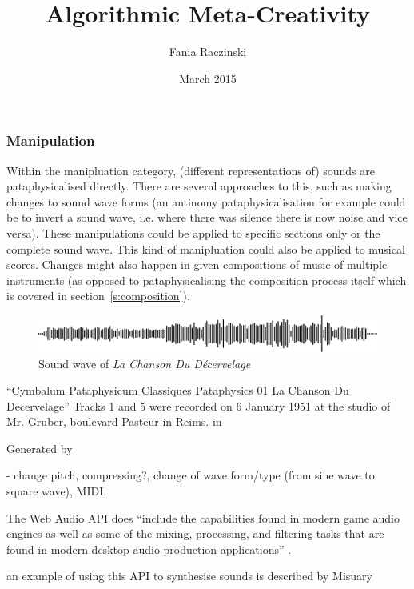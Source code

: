 \documentclass[11pt]{thesis} %
\title{Algorithmic Meta-Creativity}
\author{Fania Raczinski}
\date{March 2015}
\begin{document}
\subsubsection{Manipulation}

Within the manipluation category, (different representations of) sounds are pataphysicalised directly. There are several approaches to this, such as making changes to sound wave forms (an antinomy pataphysicalisation for example could be to invert a sound wave, i.e. where there was silence there is now noise and vice versa). These manipulations could be applied to specific sections only or the complete sound wave. This kind of manipluation could also be applied to musical scores. Changes might also happen in given compositions of music of multiple instruments (as opposed to pataphysicalising the composition process itself which is covered in section~\ref{s:composition}).

\begin{figure}[!htbp]
\centering
  \includegraphics[width=\linewidth]{simplewave.pdf}
\caption[Sound wave of \textit{La Chanson Du D{\'e}cervelage}]{Sound wave of \textit{La Chanson Du D{\'e}cervelage} \autocite[][Track 1]{UbuWebPata}}
\end{figure}

``Cymbalum Pataphysicum Classiques Pataphysics 01 La Chanson Du Decervelage''
Tracks 1 and 5 were recorded on 6 January 1951 at the studio of Mr. Gruber, boulevard Pasteur in Reims.
in \autocite[][Track 1]{UbuWebPata}

Generated by 


- change pitch, compressing?, change of wave form/type (from sine wave to square wave), MIDI,  




The Web Audio API does ``include the capabilities found in modern game audio engines as well as some of the mixing, processing, and filtering tasks that are found in modern desktop audio production applications'' \autocite{Adenot2017}.

an example of using this API to synthesise sounds is described by Misuary \autocite{Misuary2016}



\autocite{soundcloud}


\end{document}
